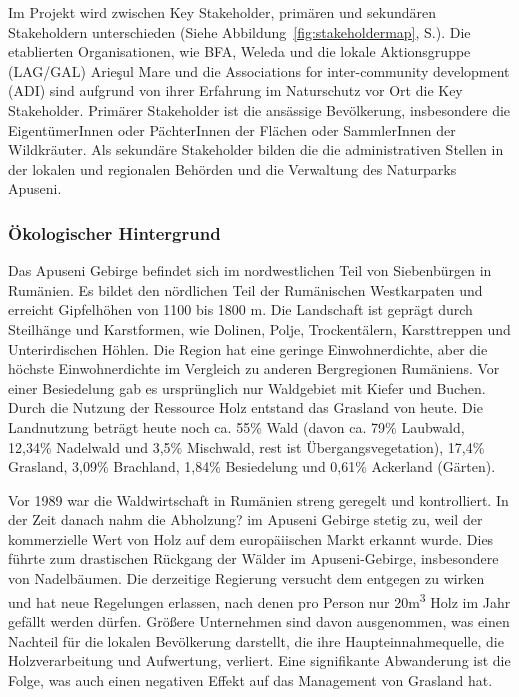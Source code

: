 Im Projekt wird zwischen Key Stakeholder, primären und sekundären Stakeholdern unterschieden (Siehe Abbildung~\ref{fig:stakeholdermap}, S.\pageref{fig:stakeholdermap}). Die etablierten Organisationen, wie BFA, Weleda und die lokale Aktionsgruppe (LAG/GAL) Arieşul Mare und die Associations for inter-community development (ADI) sind aufgrund von ihrer Erfahrung im Naturschutz vor Ort die Key Stakeholder. Primärer Stakeholder ist die ansässige Bevölkerung, insbesondere die EigentümerInnen oder PächterInnen der Flächen oder SammlerInnen der Wildkräuter. Als sekundäre Stakeholder bilden die die administrativen Stellen in der lokalen und regionalen Behörden und die Verwaltung des Naturparks Apuseni.

\subsubsection{Ökologischer Hintergrund}

Das Apuseni Gebirge befindet sich im nordwestlichen Teil von Siebenbürgen in Rumänien. Es bildet den nördlichen Teil der Rumänischen Westkarpaten und erreicht Gipfelhöhen von 1100 bis 1800 m. Die Landschaft ist geprägt durch Steilhänge und Karstformen, wie Dolinen, Polje, Trockentälern, Karsttreppen und Unterirdischen Höhlen. Die Region hat eine geringe Einwohnerdichte, aber die höchste Einwohnerdichte im Vergleich zu anderen Bergregionen Rumäniens. Vor einer Besiedelung gab es ursprünglich nur Waldgebiet mit Kiefer und Buchen. Durch die Nutzung der Ressource Holz entstand das Grasland von heute. Die Landnutzung beträgt heute noch ca. 55\% Wald (davon ca. 79\% Laubwald, 12,34\% Nadelwald und 3,5\% Mischwald, rest ist Übergangsvegetation), 17,4\% Grasland, 3,09\% Brachland, 1,84\% Besiedelung und 0,61\% Ackerland (Gärten).

Vor 1989 war die Waldwirtschaft in Rumänien streng geregelt und kontrolliert. In der Zeit danach nahm die Abholzung? im Apuseni Gebirge stetig zu, weil der kommerzielle Wert von Holz auf dem europäiischen Markt erkannt wurde. Dies führte zum drastischen Rückgang der Wälder im Apuseni-Gebirge, insbesondere von Nadelbäumen. Die derzeitige Regierung versucht dem entgegen zu wirken und hat neue Regelungen erlassen, nach denen pro Person nur 20m\textsuperscript{3} Holz im Jahr gefällt werden dürfen. Größere Unternehmen sind davon ausgenommen, was einen Nachteil für die lokalen Bevölkerung darstellt, die ihre Haupteinnahmequelle, die Holzverarbeitung und Aufwertung, verliert. Eine signifikante Abwanderung ist die Folge, was auch einen negativen Effekt auf das Management von Grasland hat.


